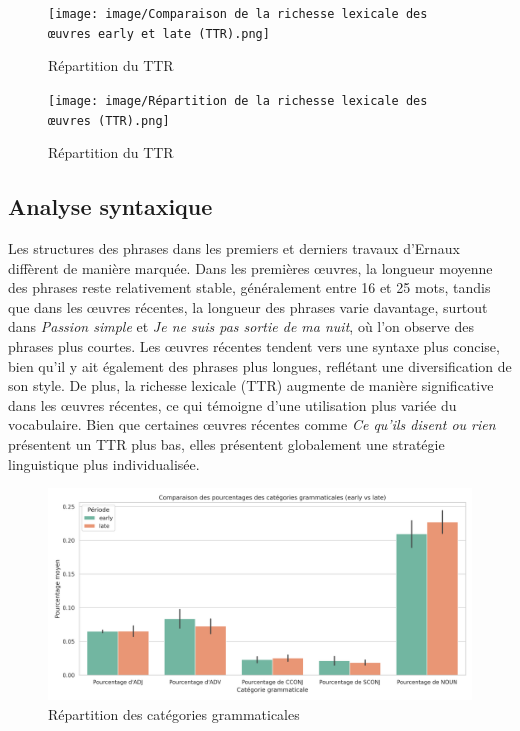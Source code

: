 \begin{figure}[ht!]
    \centering
    \texttt{[image: image/Comparaison de la richesse lexicale des œuvres early et late (TTR).png]}
    \caption{Répartition du TTR}
    \label{fig:repartition_TTR_boite}
\end{figure} 
\begin{figure}[ht!]
    \centering
    \texttt{[image: image/Répartition de la richesse lexicale des œuvres (TTR).png]}
    \caption{Répartition du TTR}
    \label{fig:repartition_TTR_barres}
\end{figure} 

\newpage

\subsection{Analyse syntaxique}
Les structures des phrases dans les premiers et derniers travaux d'Ernaux diffèrent de manière marquée. Dans les premières œuvres, la longueur moyenne des phrases reste relativement stable, généralement entre 16 et 25 mots, tandis que dans les œuvres récentes, la longueur des phrases varie davantage, surtout dans \textit{Passion simple} et \textit{Je ne suis pas sortie de ma nuit}, où l’on observe des phrases plus courtes. Les œuvres récentes tendent vers une syntaxe plus concise, bien qu’il y ait également des phrases plus longues, reflétant une diversification de son style. De plus, la richesse lexicale (TTR) augmente de manière significative dans les œuvres récentes, ce qui témoigne d’une utilisation plus variée du vocabulaire. Bien que certaines œuvres récentes comme \textit{Ce qu’ils disent ou rien} présentent un TTR plus bas, elles présentent globalement une stratégie linguistique plus individualisée.\\
\begin{figure}[ht!]
    \centering
    \includegraphics[width=\textwidth]{image/Comparaison des pourcentages des catégories grammaticales (early vs late).png}
    \caption{Répartition des catégories grammaticales}
    \label{fig:catégories grammaticales}
\end{figure}

